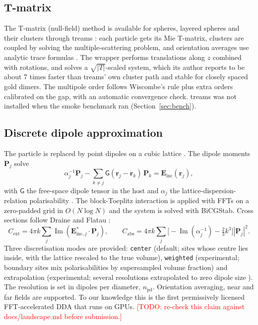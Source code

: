 \documentclass[11pt]{article}
\newcommand{\todo}[1]{\textcolor{red}{[TODO: #1]}}
\newcommand{\code}[1]{\texttt{#1}}
\newcommand{\npd}{n_\mathrm{pd}}
\begin{document}
\subsection{T-matrix}
The T-matrix (null-field) method \cite{Waterman1965} is available for spheres, layered spheres and their clusters through treams \cite{Beutel2024treams}: each particle
gets its Mie T-matrix, clusters are coupled by solving the multiple-scattering problem, and
orientation averages use analytic trace formulas \cite{Mishchenko1991}. The wrapper performs
translations along $z$ combined with rotations, and solves a $\sqrt{|T|}$-scaled system, which its
author reports to be about 7 times faster than treams' own cluster path and stable for closely spaced
gold dimers. The multipole order follows Wiscombe's rule plus extra orders calibrated on the gap, with
an automatic convergence check. treams was not installed when the smoke benchmark ran
(Section~\ref{sec:bench}).

\subsection{Discrete dipole approximation}
\label{sec:dda}
The particle is replaced by point dipoles on a cubic lattice \cite{Purcell1973,Draine1994,Yurkin2007review}. The
dipole moments $\mathbf{P}_j$ solve
\begin{equation}
  \alpha_j^{-1}\mathbf{P}_j - \sum_{k\neq j}\mathsf{G}(\mathbf{r}_j-\mathbf{r}_k)\,\mathbf{P}_k
  = \mathbf{E}_\mathrm{inc}(\mathbf{r}_j),
\end{equation}
with $\mathsf{G}$ the free-space dipole tensor in the host and $\alpha_j$ the lattice-dispersion-relation
polarisability \cite{DraineGoodman1993}. The block-Toeplitz interaction is applied with FFTs on a
zero-padded grid in $O(N\log N)$ \cite{Goodman1991} and the system is solved with BiCGStab.
Cross sections follow Draine and Flatau \cite{Draine1994}:
\begin{equation}
  C_\mathrm{ext} = 4\pi k\sum_j \operatorname{Im}(\mathbf{E}_{\mathrm{inc},j}^{*}\cdot\mathbf{P}_j),\qquad
  C_\mathrm{abs} = 4\pi k\sum_j\Big[-\operatorname{Im}(\alpha_j^{-1})-\tfrac{2}{3}k^3\Big]|\mathbf{P}_j|^2 .
\end{equation}
Three discretisation modes are provided: \code{center} (default; sites whose centre lies inside,
with the lattice rescaled to the true volume), \code{weighted} (experimental; boundary sites mix
polarisabilities by supersampled volume fraction) and extrapolation (experimental; several
resolutions extrapolated to zero dipole size \cite{Yurkin2006extrap}). The resolution is set in
dipoles per diameter, $\npd$. Orientation averaging, near and far fields are supported. To our
knowledge this is the first permissively licensed FFT-accelerated DDA that runs on GPUs.
\todo{re-check this claim against docs/landscape.md before submission.}
\end{document}
